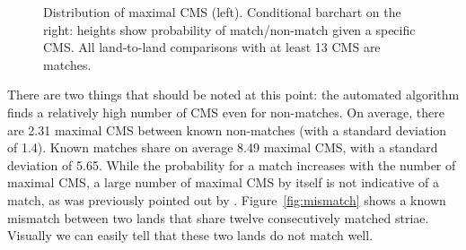 \documentclass[aoas, preprint]{imsart}\usepackage[]{graphicx}\usepackage[]{color}
\newenvironment{knitrout}{}{} %
\begin{document}
\begin{figure}[hbtp]
\begin{minipage}[t]{.52\textwidth}
\begin{knitrout}
\end{knitrout}
\end{minipage}
\caption{\label{fig:cms}Distribution of maximal CMS (left). Conditional barchart \citep{hummel} on the right: heights show probability of match/non-match given a specific CMS. All land-to-land comparisons with at least 13 CMS are matches.}
\end{figure}
%
There are two things that should be noted at this point: the automated algorithm finds a relatively high number of CMS even for non-matches. On average, there are 2.31 maximal CMS between known non-matches (with a standard deviation of 1.4). Known matches share on average 8.49 maximal CMS, with a standard deviation of 5.65. While the probability for a match increases with the number of maximal CMS, a large number of maximal CMS by itself is not indicative of a match, as was previously pointed out by \citet{miller:1998}. Figure~\ref{fig:mismatch} shows a known mismatch between two lands that share twelve consecutively matched striae. Visually we can easily tell that these two lands do not match well.
\end{document}

